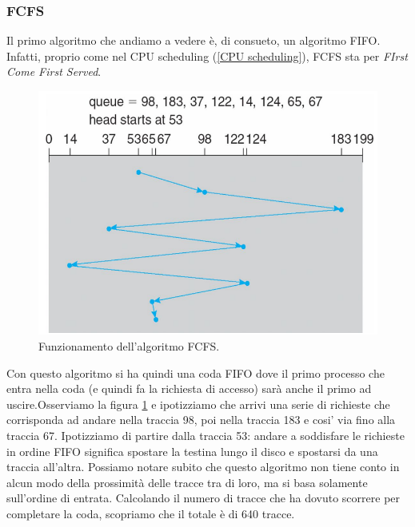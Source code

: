 \subsubsection{FCFS}
Il primo algoritmo che andiamo a vedere è, di consueto, un algoritmo FIFO. Infatti, proprio come nel CPU scheduling (\ref{CPU scheduling}), FCFS sta per \textit{FIrst Come First Served}.
\begin{figure}[h]
    \centering
    \includegraphics[width = .5\textwidth]{../res/imgs/mass memory/FCFS.png}
    \caption{Funzionamento dell'algoritmo FCFS.}
    \label{fig:FCFS_storage}
\end{figure}
 Con questo algoritmo si ha quindi una coda FIFO dove il primo processo che entra nella coda (e quindi fa la richiesta di accesso) sarà anche il primo ad uscire.Osserviamo la figura \ref{fig:FCFS_storage} e ipotizziamo che arrivi una serie di richieste che corrisponda ad andare nella traccia 98, poi nella traccia 183 e cosi' via fino alla traccia 67. Ipotizziamo di partire dalla traccia 53: andare a soddisfare le richieste in ordine FIFO significa spostare la testina lungo il disco e spostarsi da una traccia all'altra. Possiamo notare subito che questo algoritmo non tiene conto in alcun modo della prossimità delle tracce tra di loro, ma si basa solamente sull'ordine di entrata. Calcolando il numero di tracce che ha dovuto scorrere per completare la coda, scopriamo che il totale è di 640 tracce.

% 
